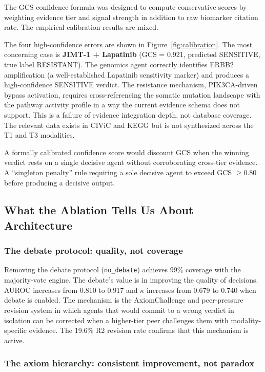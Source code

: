 \documentclass{article}
\begin{document}
The GCS confidence formula was designed to compute conservative scores by weighting evidence tier and signal strength in addition to raw biomarker citation rate. The empirical calibration results are mixed.

The four high-confidence errors are shown in Figure~\ref{fig:calibration}. The most concerning case is \textbf{JIMT-1 + Lapatinib} (GCS = 0.921, predicted SENSITIVE, true label RESISTANT). The genomics agent correctly identifies ERBB2 amplification (a well-established Lapatinib sensitivity marker) and produces a high-confidence SENSITIVE verdict. The resistance mechanism, PIK3CA-driven bypass activation, requires cross-referencing the somatic mutation landscape with the pathway activity profile in a way the current evidence schema does not support. This is a failure of evidence integration depth, not database coverage. The relevant data exists in CIViC and KEGG but is not synthesized across the T1 and T3 modalities.

A formally calibrated confidence score would discount GCS when the winning verdict rests on a single decisive agent without corroborating cross-tier evidence. A ``singleton penalty'' rule requiring a sole decisive agent to exceed GCS $\geq 0.80$ before producing a decisive output.

\subsection{What the Ablation Tells Us About Architecture}

\subsubsection{The debate protocol: quality, not coverage}

Removing the debate protocol (\texttt{no\_debate}) achieves 99\% coverage with the majority-vote engine. The debate's value is in improving the quality of decisions. AUROC increases from 0.810 to 0.917 and $\kappa$ increases from 0.679 to 0.740 when debate is enabled. The mechanism is the AxiomChallenge and peer-pressure revision system in which agents that would commit to a wrong verdict in isolation can be corrected when a higher-tier peer challenges them with modality-specific evidence. The 19.6\% R2 revision rate confirms that this mechanism is active.

\subsubsection{The axiom hierarchy: consistent improvement, not paradox}
\end{document}
